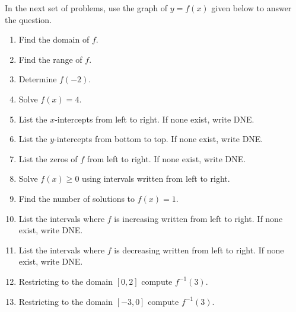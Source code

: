 \documentclass{ximera}
\author{Carl Stitz \and Jeff Zeager \and Bart Snapp \and Matthew Carr}
\begin{document}
\begin{exercise}



In the next set of problems, use the graph of $y = f(x)$ given below
to answer the question.

\begin{image}
\end{image}

\begin{enumerate}
\item  Find the domain of $f$. \label{usefuncgraphfirst}
\item  Find the range of $f$.
\item  Determine $f(-2)$.
\item  Solve $f(x) = 4$.
\item  List the $x$-intercepts from left to right. If none exist, write DNE.
\item  List the $y$-intercepts from bottom to top. If none exist, write DNE.
\item  List the zeros of $f$ from left to right. If none exist, write DNE.
\item  Solve $f(x) \geq 0$ using intervals written from left to right.
\item  Find the number of solutions to $f(x) = 1$.
\item  List the intervals where $f$ is increasing written from left to right. If none exist, write DNE.
\item  List the intervals where $f$ is decreasing written from left to right. If none exist, write DNE.
\item  Restricting to the domain $[0,2]$ compute $f^{-1}(3)$.
\item  Restricting to the domain $[-3,0]$ compute $f^{-1}(3)$.
\end{enumerate}


\end{exercise}
\end{document}
